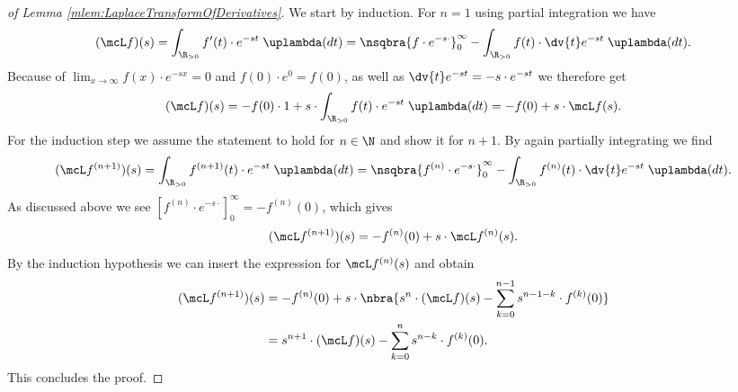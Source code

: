 \begin{proof}[of Lemma \ref{mlem:LaplaceTransformOfDerivatives}]
    We start by induction. For $n=1$ using partial integration we have
    \[
        (\mcL f)(s) = \int_{\R_{>0}} f'(t)\cdot e^{-st}\;\uplambda(dt) = \nsqbra{
            f\cdot e^{-s\cdot}
        }_0^\infty - \int_{\R_{>0}}f(t)\cdot \dv{t}e^{-st}\;\uplambda(dt).
    \]
    Because of $\lim_{x\to\infty}f(x)\cdot e^{-sx} = 0$ and $f(0)\cdot e^0 = f(0)$, as well as $\dv{t}e^{-st} = -s\cdot e^{-st}$ we therefore get
    \[
        (\mcL f)(s) = -f(0) \cdot 1 + s\cdot\int_{\R_{>0}}f(t)\cdot e^{-st}\;\uplambda(dt) = -f(0) + s\cdot\mcL f(s).    
    \] 
    For the induction step we assume the statement to hold for $n\in\N$ and show it for $n+1$. By again partially integrating we find
    \[
        (\mcL f^{(n+1)})(s) = \int_{\R_{>0}}f^{(n+1)}(t)\cdot e^{-st}\;\uplambda(dt) = \nsqbra{
            f^{(n)}\cdot e^{-s\cdot}
        }
        _0^\infty - \int_{\R_{>0}}f^{(n)}(t)\cdot \dv{t}e^{-st}\;\uplambda(dt).
    \]
    As discussed above we see $[f^{(n)}\cdot e^{-s\cdot}]_0^\infty = -f^{(n)}(0)$, which gives
    \[
        (\mcL f^{(n+1)})(s) = -f^{(n)}(0) + s\cdot\mcL f^{(n)}(s).
    \]
    By the induction hypothesis we can insert the expression for $\mcL f^{(n)}(s)$ and obtain
    \begin{align*}
        (\mcL f^{(n+1)})(s) &= -f^{(n)}(0) + s\cdot\nbra{
            s^n\cdot(\mcL f)(s) - \sum_{k=0}^{n-1}s^{n-1-k}\cdot f^{(k)}(0)
        } \\
        &= s^{n+1}\cdot(\mcL f)(s) - \sum_{k=0}^{n}s^{n-k}\cdot f^{(k)}(0).
    \end{align*}
    This concludes the proof.
\end{proof}
